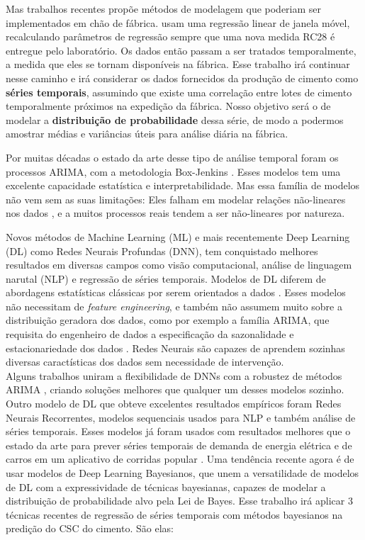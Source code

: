 Mas trabalhos recentes propõe métodos de modelagem que poderiam ser implementados em chão de fábrica. \cite{greciaLin,dynstat} usam uma regressão linear de janela móvel, recalculando parâmetros de regressão sempre que uma nova medida RC28 é entregue pelo laboratório. Os dados então passam a ser tratados temporalmente, a medida que eles se tornam disponíveis na fábrica. Esse trabalho irá continuar nesse caminho e irá considerar os dados fornecidos da produção de cimento como \textbf{séries temporais}, assumindo que existe uma correlação entre lotes de cimento temporalmente próximos na expedição da fábrica. Nosso objetivo será o de modelar a \textbf{distribuição de probabilidade} dessa série, de modo a podermos amostrar médias e variâncias úteis para análise diária na fábrica. 

Por muitas décadas o estado da arte desse tipo de análise temporal foram os processos ARIMA, com a metodologia Box-Jenkins \citep{arima}. Esses modelos tem uma excelente capacidade estatística e interpretabilidade. Mas essa família de modelos não vem sem as suas limitações: Eles falham em modelar relações não-lineares nos dados \citep{forecasting}, e a muitos processos reais tendem a ser não-lineares por natureza.

Novos métodos de Machine Learning (ML) e mais recentemente Deep Learning (DL) como Redes Neurais Profundas (DNN), tem conquistado melhores resultados em diversas campos como visão computacional, análise de linguagem narutal (NLP) e regressão de séries temporais. Modelos de DL diferem de abordagens estatísticas clássicas por serem orientados a dados \citep{dlbook}. Esses modelos não necessitam de \textit{feature engineering}, e também não assumem muito sobre a distribuição geradora dos dados, como por exemplo a família ARIMA, que requisita do engenheiro de dados a especificação da sazonalidade e estacionariedade dos dados \citep{arima}. Redes Neurais são capazes de aprendem sozinhas diversas caractísticas dos dados sem necessidade de intervenção. \\

Alguns trabalhos uniram a flexibilidade de DNNs com a robustez de métodos ARIMA \citep{DIAZROBLES20088331,KHASHEI2010479}, criando soluções melhores que qualquer um desses modelos sozinho.
Outro modelo de DL que obteve excelentes resultados empíricos foram Redes Neurais Recorrentes, modelos sequenciais usados para NLP e também análise de séries temporais. Esses modelos já foram usados com resultados melhores que o estado da arte para prever séries temporais de demanda de energia elétrica e de carros em um aplicativo de corridas popular \cite{energylstm,ubertime}. Uma tendência recente agora é de usar modelos de Deep Learning Bayesianos, que unem a versatilidade de modelos de DL com a expressividade de técnicas bayesianas, capazes de modelar a distribuição de probabilidade alvo pela Lei de Bayes. Esse trabalho irá aplicar 3 técnicas recentes de regressão de séries temporais com métodos bayesianos na predição do CSC do cimento. São elas:




